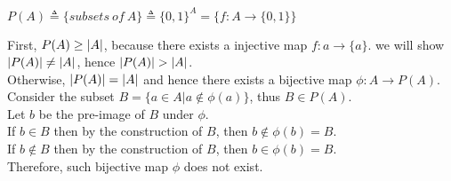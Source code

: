 \begin{myDef}
	$P(A)\triangleq \{subsets\ of\ A\}\triangleq\{0,1\}^A=\{f: A\rightarrow \{0,1\}\}$
\end{myDef}
\begin{myTheo}[$P(A)>\abs{A}$]
	First, $P(A)\geq\lvert A\rvert$, because there exists a injective map $f: a\rightarrow \{a\}$. we will show $\lvert P(A)\rvert\neq \lvert A\rvert$, hence $\lvert P(A)\rvert>\lvert A\rvert$.
	\\
	Otherwise, $\lvert P(A)\rvert=\lvert A\rvert$ and hence there exists a bijective map $\phi: A\rightarrow P(A)$.
	\\
	Consider the subset $B=\{a\in A|a\notin \phi(a)\}$, thus $B\in P(A)$.
	\\
	Let $b$ be the pre-image of $B$ under $\phi$.
	\\
	If $b\in B$ then by the construction of $B$, then $b\notin \phi(b)=B$.
	\\
	If $b\notin B$ then by the construction of $B$, then $b\in \phi(b)=B$.
	\\
	Therefore, such bijective map $\phi$ does not exist.
\end{myTheo}
